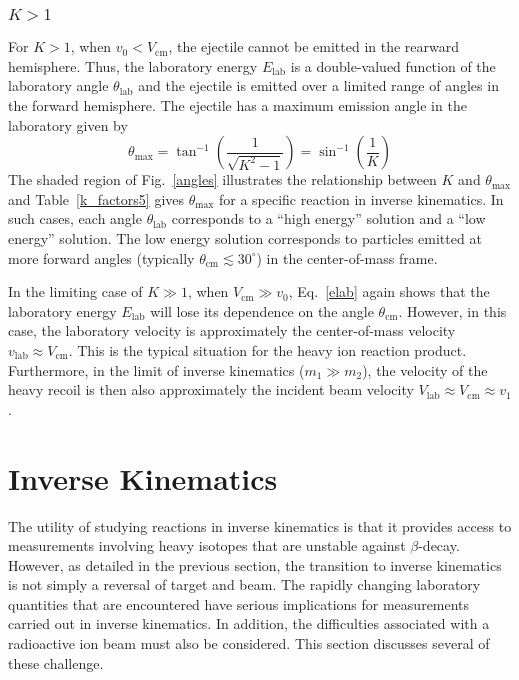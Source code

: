 \subsubsection{$K>1$}
For $K>1$, when $v_0<V_\mathrm{cm}$, the ejectile cannot be emitted in the rearward hemisphere.  Thus,  the laboratory energy $E_\mathrm{lab}$ is a double-valued function of the laboratory angle $\theta_\mathrm{lab}$ and the ejectile is emitted over a limited range of angles in the forward hemisphere.  The ejectile has a maximum emission angle in the laboratory given by
\begin{equation}
\theta_\mathrm{max}=\tan^{-1}\left(\frac{1}{\sqrt{K^2-1}}\right)=\sin^{-1}\left(\frac{1}{K}\right)
\label{max_theta}
\end{equation}
The shaded region of Fig.~\ref{angles} illustrates the relationship between $K$ and $\theta_\mathrm{max}$ and Table~\ref{k_factors5} gives $\theta_\mathrm{max}$ for a specific reaction in inverse kinematics.
In such cases, each angle $\theta_\mathrm{lab}$ corresponds to a ``high energy'' solution and a ``low energy'' solution.  The low energy solution corresponds to particles emitted at more forward angles (typically $\theta_\textrm{cm} \lesssim 30^\circ$) in the center-of-mass frame.

In the limiting case of $K \gg 1$, when $V_\textrm{cm} \gg v_0$, Eq.~\ref{elab}  again shows that the laboratory energy $E_\textrm{lab}$ will lose its dependence on the angle $\theta_\textrm{cm}$.  However, in this case, the laboratory velocity is approximately the center-of-mass velocity $v_\textrm{lab}\approx V_\textrm{cm}$.  This is the typical situation for the heavy ion reaction product.  Furthermore, in the limit of inverse kinematics ($m_1\gg m_2$), the velocity of the heavy recoil is then also approximately the incident beam velocity $V_\textrm{lab}\approx V_\textrm{cm} \approx v_1$.  

\section{Inverse Kinematics}
The utility of studying reactions in inverse kinematics is that it provides access to measurements involving heavy isotopes that are unstable against $\beta$-decay.
However, as detailed in the previous section, the transition to inverse kinematics is not simply a reversal of target and beam.  The rapidly changing laboratory quantities that are encountered have serious implications for measurements carried out in inverse kinematics.  In addition, the difficulties associated with a radioactive ion beam must also be considered.  This section discusses several of these challenge.
 
